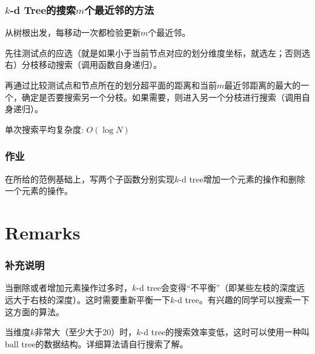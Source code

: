 \documentclass[CJK]{beamer}
\begin{document}
  \begin{frame}
    \frametitle{$k$-d Tree的搜索$m$个最近邻的方法}
    \bitem
  \item{从树根出发，每移动一次都检验更新$m$个最近邻。}
    \item{先往测试点的应选（就是如果小于当前节点对应的划分维度坐标，就选左；否则选右）分枝移动搜索（调用函数自身递归）。}
    \item{再通过比较{\blue 测试点和节点所在的划分超平面的距离}和当前$m$最近邻距离的最大的一个，确定是否要搜索另一个分枝。如果需要，则进入另一个分枝进行搜索（调用自身递归）。}
      \eitem


      \skiplines
      
      单次搜索平均复杂度: $O(\log N)$
    
  \end{frame}


  \begin{frame}
    \frametitle{作业}

    在所给的范例基础上，写两个子函数分别实现$k$-d tree增加一个元素的操作和删除一个元素的操作。
    
  \end{frame}
  

  \section{Remarks}
  
  \begin{frame}
    \frametitle{补充说明}

    \bitem
  \item{当删除或者增加元素操作过多时，$k$-d tree会变得“不平衡”（即某些左枝的深度远远大于右枝的深度）。这时需要重新平衡一下$k$-d tree。有兴趣的同学可以搜索一下这方面的算法。}
  \item{当维度$k$非常大（至少大于20）时，$k$-d tree的搜索效率变低，这时可以使用一种叫ball tree的数据结构。详细算法请自行搜索了解。}
    \eitem

    
  \end{frame}
  
  
  
  \ech
\end{document}
